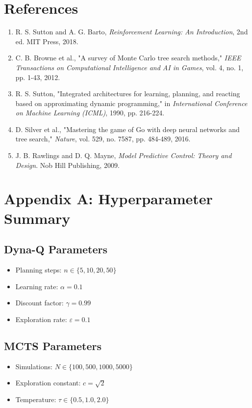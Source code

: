 \documentclass[12pt]{article}
\numberwithin{equation}{section}
\numberwithin{figure}{section}
\numberwithin{table}{section}
\numberwithin{algorithm}{section}
\begin{document}
{{{\section*{References}
\begin{enumerate}
    \item R. S. Sutton and A. G. Barto, \textit{Reinforcement Learning: An Introduction}, 2nd ed. MIT Press, 2018.
    \item C. B. Browne et al., "A survey of Monte Carlo tree search methods," \textit{IEEE Transactions on Computational Intelligence and AI in Games}, vol. 4, no. 1, pp. 1-43, 2012.
    \item R. S. Sutton, "Integrated architectures for learning, planning, and reacting based on approximating dynamic programming," in \textit{International Conference on Machine Learning (ICML)}, 1990, pp. 216-224.
    \item D. Silver et al., "Mastering the game of Go with deep neural networks and tree search," \textit{Nature}, vol. 529, no. 7587, pp. 484-489, 2016.
    \item J. B. Rawlings and D. Q. Mayne, \textit{Model Predictive Control: Theory and Design}. Nob Hill Publishing, 2009.
\end{enumerate}

\section*{Appendix A: Hyperparameter Summary}

\subsection{Dyna-Q Parameters}
\begin{itemize}
    \item Planning steps: $n \in \{5, 10, 20, 50\}$
    \item Learning rate: $\alpha = 0.1$
    \item Discount factor: $\gamma = 0.99$
    \item Exploration rate: $\varepsilon = 0.1$
\end{itemize}

\subsection{MCTS Parameters}
\begin{itemize}
    \item Simulations: $N \in \{100, 500, 1000, 5000\}$
    \item Exploration constant: $c = \sqrt{2}$
    \item Temperature: $\tau \in \{0.5, 1.0, 2.0\}$
\end{itemize}

}}}
\end{document}
